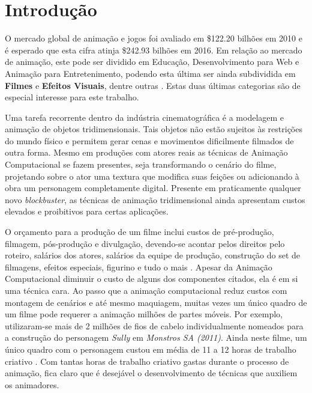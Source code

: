 \chapter{Introdução\label{chap:Introducao}}

O mercado global de animação e jogos foi avaliado em \$122.20 bilhões em 2010 e é esperado que esta cifra atinja  \$242.93 bilhões em 2016. Em relação ao mercado de animação, este pode ser dividido em Educação, Desenvolvimento para Web e Animação para Entretenimento, podendo esta última ser ainda subdividida em \textbf{Filmes} e \textbf{Efeitos Visuais}, dentre outras \cite{animationMarketSize}. Estas duas últimas categorias são de especial interesse para este trabalho. 

Uma tarefa recorrente dentro da indústria cinematográfica é a modelagem e animação de objetos tridimensionais. Tais objetos não estão sujeitos às restrições do mundo físico e permitem gerar cenas e movimentos dificilmente filmados de outra forma. Mesmo em produções com atores reais as técnicas de Animação Computacional se fazem presentes, seja transformando o cenário do filme, projetando sobre o ator uma textura que modifica suas feições ou adicionando à obra um personagem completamente digital. Presente em praticamente qualquer novo \textit{blockbuster}, as técnicas de animação tridimensional ainda apresentam custos elevados e proibitivos para certas aplicações.

O orçamento para a produção de um filme inclui custos de pré-produção, filmagem, pós-produção e divulgação, devendo-se acontar pelos direitos pelo roteiro, salários dos atores, salários da equipe de produção, construção do set de filmagens, efeitos especiais, figurino e tudo o mais \cite{movieProductionCost}. Apesar da Animação Computacional diminuir o custo de alguns dos componentes citados, ela é em si uma técnica cara. Ao passo que a animação computacional  reduz custos com montagem de cenários e até mesmo maquiagem, muitas vezes um único quadro de um filme pode requerer a animação milhões de partes móveis. Por exemplo, utilizaram-se mais de 2 milhões de fios de cabelo individualmente nomeados para a construção do personagem \textit{Sully} em \textit{Monstros SA (2011)}. Ainda neste filme, um único quadro com o personagem custou em média de 11 a 12 horas de trabalho criativo \cite{sullyExample}. Com tantas horas de trabalho criativo gastas durante o processo de animação, fica claro que é desejável o desenvolvimento de técnicas que auxiliem os animadores.

